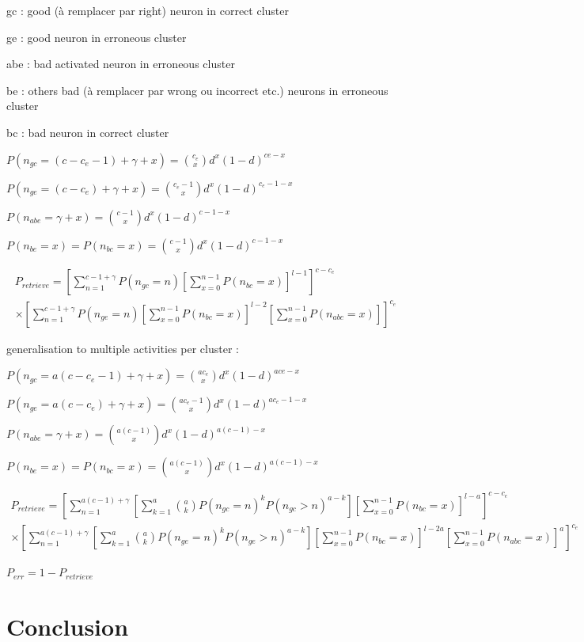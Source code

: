 \documentclass[english,11pt,twocolumn]{article}
\theoremstyle{definition}
\begin{document}
	gc : good (à remplacer par right) neuron in correct cluster
	
	ge : good neuron in erroneous cluster
	
	abe : bad activated neuron in erroneous cluster
	
	be : others bad (à remplacer par wrong ou incorrect etc.) neurons in erroneous cluster
	
	bc : bad neuron in correct cluster
	
	$P(n_{gc} = (c - c_e - 1) + \gamma + x) = {c_e \choose x} d^x (1-d)^{ce-x}$
	
	$P(n_{ge} = (c - c_e) + \gamma + x) = {c_e - 1 \choose x} d^x (1-d)^{c_e-1-x}$
	
	$P(n_{abe} = \gamma + x) = {c - 1 \choose x} d^x (1-d)^{c-1-x}$
	
	$P(n_{be} = x) = P(n_{bc} = x) = {c - 1 \choose x} d^x (1-d)^{c- 1 -x}$
	
	\begin{align*}
	P_{retrieve} = \left [ \sum_{n = 1}^{c-1+\gamma} P(n_{gc} = n) \left [ \sum_{x=0}^{n-1} P(n_{bc} = x) \right]^{l-1} \right ]^{c - c_e} \\ \times \left [ \sum_{n = 1}^{c-1+\gamma} P(n_{ge} = n) \left [ \sum_{x=0}^{n-1} P(n_{bc} = x) \right]^{l-2} \left [ \sum_{x=0}^{n-1} P(n_{abc} = x) \right] \right ]^{c_e}
	\end{align*}
	
	
	generalisation to multiple activities per cluster :
	
	$P(n_{gc} = a(c - c_e - 1) + \gamma + x) = {a c_e \choose x} d^x (1-d)^{a ce-x}$
	
	$P(n_{ge} = a(c - c_e) + \gamma + x) = {a c_e - 1 \choose x} d^x (1-d)^{a c_e-1-x}$
	
	$P(n_{abe} = \gamma + x) = {a(c - 1) \choose x} d^x (1-d)^{a(c-1)-x}$
	
	$P(n_{be} = x) = P(n_{bc} = x) = {a(c - 1) \choose x} d^x (1-d)^{a(c- 1) -x}$	

	
	
	\begin{align*}
	P_{retrieve} = \left [ \sum_{n = 1}^{a(c-1) + \gamma} \left [ \sum_{k = 1}^{a} { a \choose k }   P(n_{gc} = n)^k P(n_{gc} > n)^{a-k} \right ]\left [ \sum_{x=0}^{n-1} P(n_{bc} = x) \right]^{l-a} \right ]^{c - c_e} \\ \times \left [ \sum_{n = 1}^{a(c-1) +\gamma} \left[ \sum_{k = 1}^a { a \choose k } P(n_{ge} = n)^k P(n_{ge} > n)^{a-k} \right ] \left [ \sum_{x=0}^{n-1} P(n_{bc} = x) \right]^{l-2a} \left [ \sum_{x=0}^{n-1} P(n_{abc} = x) \right]^a \right ]^{c_e}
	\end{align*}
	
	$P_{err} = 1 - P_{retrieve}$

	\section{Conclusion}	
	
	
	\nocite{*}
         
\end{document}
